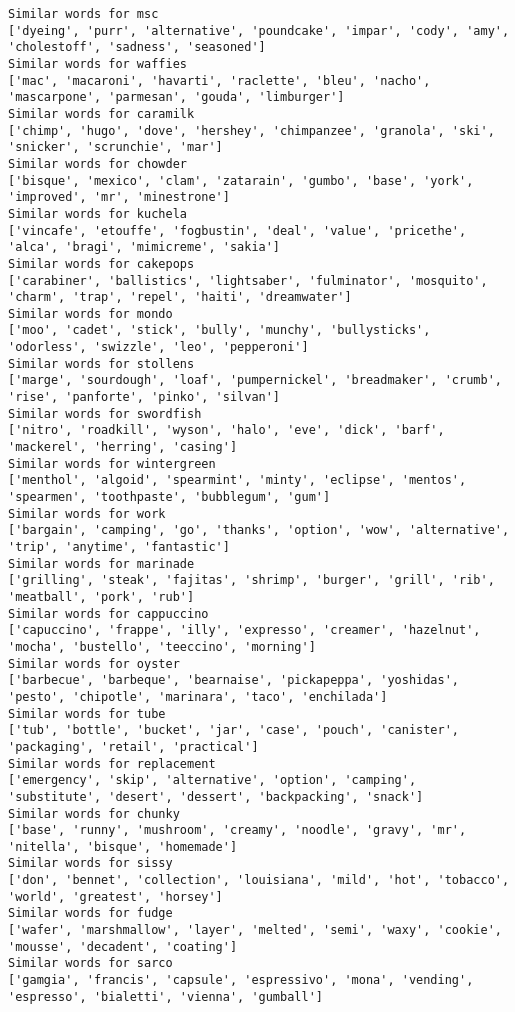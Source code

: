 \documentclass[11pt]{article}
\begin{document}
\begin{Verbatim}[commandchars=\\\{\}]
Similar words for msc
['dyeing', 'purr', 'alternative', 'poundcake', 'impar', 'cody', 'amy', 'cholestoff', 'sadness', 'seasoned']
Similar words for waffies
['mac', 'macaroni', 'havarti', 'raclette', 'bleu', 'nacho', 'mascarpone', 'parmesan', 'gouda', 'limburger']
Similar words for caramilk
['chimp', 'hugo', 'dove', 'hershey', 'chimpanzee', 'granola', 'ski', 'snicker', 'scrunchie', 'mar']
Similar words for chowder
['bisque', 'mexico', 'clam', 'zatarain', 'gumbo', 'base', 'york', 'improved', 'mr', 'minestrone']
Similar words for kuchela
['vincafe', 'etouffe', 'fogbustin', 'deal', 'value', 'pricethe', 'alca', 'bragi', 'mimicreme', 'sakia']
Similar words for cakepops
['carabiner', 'ballistics', 'lightsaber', 'fulminator', 'mosquito', 'charm', 'trap', 'repel', 'haiti', 'dreamwater']
Similar words for mondo
['moo', 'cadet', 'stick', 'bully', 'munchy', 'bullysticks', 'odorless', 'swizzle', 'leo', 'pepperoni']
Similar words for stollens
['marge', 'sourdough', 'loaf', 'pumpernickel', 'breadmaker', 'crumb', 'rise', 'panforte', 'pinko', 'silvan']
Similar words for swordfish
['nitro', 'roadkill', 'wyson', 'halo', 'eve', 'dick', 'barf', 'mackerel', 'herring', 'casing']
Similar words for wintergreen
['menthol', 'algoid', 'spearmint', 'minty', 'eclipse', 'mentos', 'spearmen', 'toothpaste', 'bubblegum', 'gum']
Similar words for work
['bargain', 'camping', 'go', 'thanks', 'option', 'wow', 'alternative', 'trip', 'anytime', 'fantastic']
Similar words for marinade
['grilling', 'steak', 'fajitas', 'shrimp', 'burger', 'grill', 'rib', 'meatball', 'pork', 'rub']
Similar words for cappuccino
['capuccino', 'frappe', 'illy', 'expresso', 'creamer', 'hazelnut', 'mocha', 'bustello', 'teeccino', 'morning']
Similar words for oyster
['barbecue', 'barbeque', 'bearnaise', 'pickapeppa', 'yoshidas', 'pesto', 'chipotle', 'marinara', 'taco', 'enchilada']
Similar words for tube
['tub', 'bottle', 'bucket', 'jar', 'case', 'pouch', 'canister', 'packaging', 'retail', 'practical']
Similar words for replacement
['emergency', 'skip', 'alternative', 'option', 'camping', 'substitute', 'desert', 'dessert', 'backpacking', 'snack']
Similar words for chunky
['base', 'runny', 'mushroom', 'creamy', 'noodle', 'gravy', 'mr', 'nitella', 'bisque', 'homemade']
Similar words for sissy
['don', 'bennet', 'collection', 'louisiana', 'mild', 'hot', 'tobacco', 'world', 'greatest', 'horsey']
Similar words for fudge
['wafer', 'marshmallow', 'layer', 'melted', 'semi', 'waxy', 'cookie', 'mousse', 'decadent', 'coating']
Similar words for sarco
['gamgia', 'francis', 'capsule', 'espressivo', 'mona', 'vending', 'espresso', 'bialetti', 'vienna', 'gumball']

\end{Verbatim}
\end{document}
